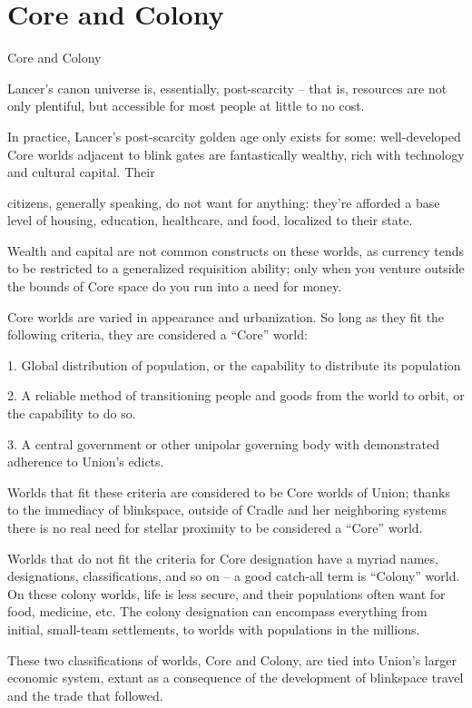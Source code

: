 \section{Core and Colony}
Core and Colony

Lancer’s canon universe is, essentially, post-scarcity -- that is, resources are not only plentiful,
but accessible for most people at little to no cost.


In practice, Lancer’s post-scarcity golden age only exists for some: well-developed Core worlds
adjacent to blink gates are fantastically wealthy, rich with technology and cultural capital. Their




citizens, generally speaking, do not want for anything: they’re afforded a base level of housing,
education, healthcare, and food, localized to their state.


Wealth and capital are not common constructs on these worlds, as currency tends to be
restricted to a generalized requisition ability; only when you venture outside the bounds of Core
space do you run into a need for money.


Core worlds are varied in appearance and urbanization. So long as they fit the following criteria,
they are considered a “Core” world:


     1.  Global distribution of population, or the capability to distribute its population

    2.   A reliable method of transitioning people and goods from the world to orbit, or the
         capability to do so.

     3.  A central government or other unipolar governing body with demonstrated adherence to
         Union’s edicts.


Worlds that fit these criteria are considered to be Core worlds of Union; thanks to the immediacy
of blinkspace, outside of Cradle and her neighboring systems there is no real need for stellar
proximity to be considered a “Core” world.


Worlds that do not fit the criteria for Core designation have a myriad names, designations,
classifications, and so on -- a good catch-all term is “Colony” world. On these colony worlds, life
is less secure, and their populations often want for food, medicine, etc. The colony designation
can encompass everything from initial, small-team settlements, to worlds with populations in the
millions.


These two classifications of worlds, Core and Colony, are tied into Union’s larger economic
system, extant as a consequence of the development of blinkspace travel and the trade that
followed.


